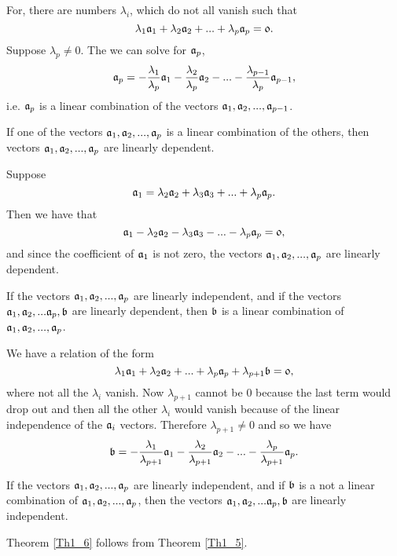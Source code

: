 For, there are numbers $\lambda_i$, which do not all vanish such that $$\lambda_1 \mathfrak{a}_1 + \lambda_2 \mathfrak{a}_2 +...+ \lambda_p \mathfrak{a}_p = \mathfrak{0}.$$ Suppose $\lambda_p \ne 0$. The we can solve for $\mathfrak{a}_p$,
$$\mathfrak{a}_p = -{\lambda_1\over \lambda_p}\mathfrak{a}_1 -{\lambda_2\over \lambda_p}\mathfrak{a}_2 - ... - {\lambda_{p-1}\over \lambda_p} \mathfrak{a}_{p-1},$$ i.e. $\mathfrak{a}_p$ is a linear combination of the vectors $\mathfrak{a}_1, \mathfrak{a}_2, ..., \mathfrak{a}_{p-1}$.  

\begin{theorem}
If one of the vectors $\mathfrak{a}_1, \mathfrak{a}_2, ..., \mathfrak{a}_p$ is a linear combination of the others, then vectors $\mathfrak{a}_1,\mathfrak{a}_2,...,\mathfrak{a}_p$ are linearly dependent.\label{Th1_4}
\end{theorem}

Suppose $$\mathfrak{a}_1 = \lambda_2 \mathfrak{a}_2 + \lambda_3 \mathfrak{a}_3 +... + \lambda_p \mathfrak{a}_p.$$ Then we have that 
$$\mathfrak{a}_1 - \lambda_2 \mathfrak{a}_2 - \lambda_3 \mathfrak{a}_3 -... - \lambda_p \mathfrak{a}_p = \mathfrak{0},$$ and since the coefficient of $\mathfrak{a}_1$ is not zero, the vectors $\mathfrak{a}_1, \mathfrak{a}_2, ... , \mathfrak{a}_p$ are linearly dependent. 

\begin{theorem}
If the vectors $\mathfrak{a}_1, \mathfrak{a}_2, ..., \mathfrak{a}_p$ are linearly independent, and if the vectors $\mathfrak{a}_1, \mathfrak{a}_2,...\mathfrak{a}_p,\mathfrak{b}$ are linearly dependent, then $\mathfrak{b}$ is a linear
combination of $\mathfrak{a}_1, \mathfrak{a}_2, ..., \mathfrak{a}_p$.\label{Th1_5}
\end{theorem}

We have a relation of the form $$\lambda_1 \mathfrak{a}_1 + \lambda_2 \mathfrak{a}_2 +... + \lambda_p \mathfrak{a}_p + \lambda_{p+1} \mathfrak{b} =\mathfrak{0},$$ where not all the $\lambda_i$ vanish. Now
$\lambda_{p+1}$ cannot be 0 because the last term would drop out and then all the other $\lambda_i$ would vanish because of the linear independence of the $\mathfrak{a}_i$ vectors. Therefore
$\lambda_{p+1} \ne 0$ and so we have 
$$\mathfrak{b} = -{\lambda_1\over \lambda_{p+1}}\mathfrak{a}_1 -{\lambda_2\over \lambda_{p+1}}\mathfrak{a}_2 - ... - {\lambda_p\over \lambda_{p+1}} \mathfrak{a}_p.$$


\begin{theorem}
If the vectors $\mathfrak{a}_1, \mathfrak{a}_2, ..., \mathfrak{a}_p$ are linearly independent, and if $\mathfrak{b}$ is a not a linear combination of $\mathfrak{a}_1, \mathfrak{a}_2, ..., \mathfrak{a}_p$, then the vectors
$\mathfrak{a}_1, \mathfrak{a}_2,...\mathfrak{a}_p,\mathfrak{b}$ are linearly independent.\label{Th1_6}
\end{theorem}

Theorem \ref{Th1_6} follows from Theorem \ref{Th1_5}.